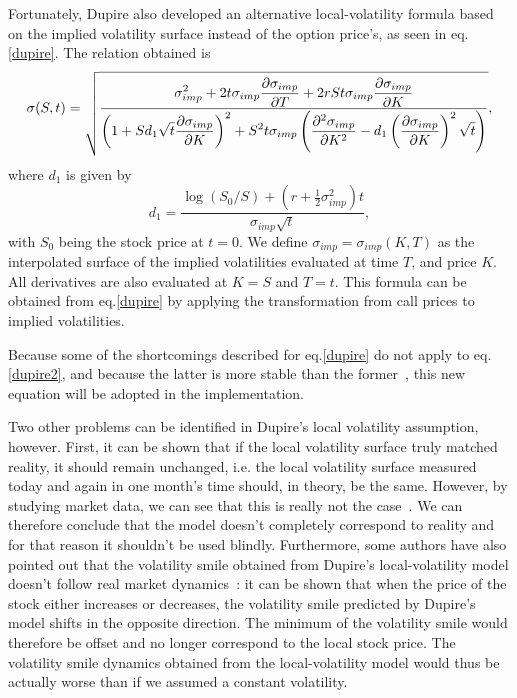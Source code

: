 Fortunately, Dupire also developed an alternative local-volatility formula based on the implied volatility surface instead of the option price's, as seen in eq.\ref{dupire}.
The relation obtained is
\begin{equation}\label{dupire2}
\sigma(S,t)=\sqrt{\frac{\displaystyle\sigma_{imp}^2+2t\sigma_{imp}\pdv{\sigma_{imp}}{T}+2rSt\sigma_{imp}\pdv{\sigma_{imp}}{K}}{\displaystyle\left(1+Sd_1\sqrt{t}\pdv{\sigma_{imp}}{K}\right)^2+S^2t\sigma_{imp}\left(\pdv{^2\sigma_{imp}}{K^2}-d_1\left(\pdv{\sigma_{imp}}{K}\right)^2\sqrt{t}\right)}},
\end{equation}
\noindent where $d_1$ is given by
\begin{equation}
d_1=\frac{\log(S_0/S)+\left(r+\frac{1}{2}\sigma_{imp}^2\right)t}{\sigma_{imp}\sqrt{t}},
\end{equation}
\noindent with $S_0$ being the stock price at $t=0$. We define $\sigma_{imp}=\sigma_{imp}(K,T)$ as the interpolated surface of the implied volatilities evaluated at time $T$, and price $K$. All derivatives are also evaluated at $K=S$ and $T=t$. This formula can be obtained from eq.\eqref{dupire} by applying the transformation from call prices to implied volatilities.

Because some of the shortcomings described for eq.\eqref{dupire} do not apply to eq.\eqref{dupire2}, and because the latter is more stable than the former~\cite{Wilmott3}, this new equation will be adopted in the implementation.


Two other problems can be identified in Dupire's local volatility assumption, however.
First, it can be shown that if the local volatility surface truly matched reality, it should remain unchanged, i.e. the local volatility surface measured today and again in one month's time should, in theory, be the same. However, by studying market data, we can see that this is really not the case~\cite{Wilmott3}. We can therefore conclude that the model doesn't completely correspond to reality and for that reason it shouldn't be used blindly.
Furthermore, some authors have also pointed out that the volatility smile obtained from Dupire's local-volatility model doesn't follow real market dynamics~\cite{Hagan}: it can be shown that when the price of the stock either increases or decreases, the volatility smile predicted by Dupire's model shifts in the opposite direction. The minimum of the volatility smile would therefore be offset and no longer correspond to the local stock price. The volatility smile dynamics obtained from the local-volatility model would thus be actually worse than if we assumed a constant volatility.

